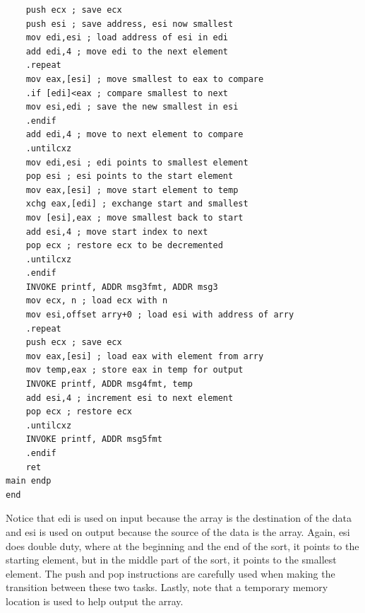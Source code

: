 \documentclass[10pt]{book}
\begin{document}
\begin{verbatim}
    push ecx ; save ecx
    push esi ; save address, esi now smallest
    mov edi,esi ; load address of esi in edi
    add edi,4 ; move edi to the next element
    .repeat
    mov eax,[esi] ; move smallest to eax to compare
    .if [edi]<eax ; compare smallest to next
    mov esi,edi ; save the new smallest in esi
    .endif
    add edi,4 ; move to next element to compare
    .untilcxz
    mov edi,esi ; edi points to smallest element
    pop esi ; esi points to the start element
    mov eax,[esi] ; move start element to temp
    xchg eax,[edi] ; exchange start and smallest
    mov [esi],eax ; move smallest back to start
    add esi,4 ; move start index to next
    pop ecx ; restore ecx to be decremented
    .untilcxz
    .endif
    INVOKE printf, ADDR msg3fmt, ADDR msg3
    mov ecx, n ; load ecx with n
    mov esi,offset arry+0 ; load esi with address of arry
    .repeat
    push ecx ; save ecx
    mov eax,[esi] ; load eax with element from arry
    mov temp,eax ; store eax in temp for output
    INVOKE printf, ADDR msg4fmt, temp
    add esi,4 ; increment esi to next element
    pop ecx ; restore ecx
    .untilcxz
    INVOKE printf, ADDR msg5fmt
    .endif
    ret
main endp
end
\end{verbatim}

Notice that edi is used on input because the array is the destination of the data and esi is used on output because the source of the data is the array. Again, esi does double duty, where at the beginning and the end of the sort, it points to the starting element, but in the middle part of the sort, it points to the smallest element.
The push and pop instructions are carefully used when making the transition between these two tasks. Lastly, note that a temporary memory location is used to help output the array.
\end{document}
